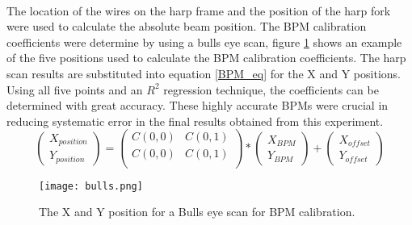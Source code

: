 	 \paragraph{}The location of the wires on the harp frame and the position of the harp fork were used to calculate the absolute beam position. The BPM calibration coefficients were determine by using a bulls eye scan, figure \ref{bulls} shows an example of the five positions used to calculate the BPM calibration coefficients. The harp scan results are substituted into equation \ref{BPM_eq} for the X and Y positions. Using all five points and an $R^2$ regression technique, the coefficients can be determined with great accuracy. These highly accurate BPMs were crucial in reducing systematic error in the final results obtained from this experiment. 
	 \begin{equation}
	 \label{BPM_eq}
	 \begin{pmatrix}
	 X_{position}\\
	 Y_{position}
	 \end{pmatrix}
	=
		 \begin{pmatrix}
		 C(0,0) & C(0,1)\\
 		 C(0,0) & C(0,1)\\
		 \end{pmatrix}
		 *
		 	 \begin{pmatrix}
		 	 X_{BPM}\\
		 	 Y_{BPM}
		 	 \end{pmatrix}
		 	 +
		 	 \begin{pmatrix}
		 	 X_{offset}\\
		 	 Y_{offset}
		 	 \end{pmatrix}			 
	 	 \end{equation}
	
		\begin{figure}[H]
			\centering
			\caption{The X and Y position for a Bulls eye scan for BPM calibration. }
			\label{bulls}
			\texttt{[image: bulls.png]} 
		\end{figure} 	
	